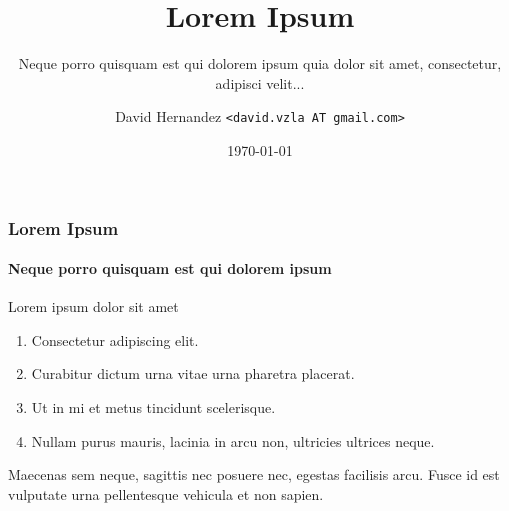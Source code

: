 \documentclass{beamer}
\title{Lorem Ipsum}
\subtitle{Neque porro quisquam est qui dolorem ipsum quia dolor sit amet, consectetur, adipisci velit...}
\date{\today}
\author{David Hernandez \texttt{<david.vzla AT gmail.com>}}
\begin{document}
\begin{frame}
\titlepage
\end{frame}


\begin{frame}
\frametitle{Lorem Ipsum}
\framesubtitle{Neque porro quisquam est qui dolorem ipsum}
\begin{theorem}
Lorem ipsum dolor sit amet \end{theorem}
\begin{enumerate}
\item Consectetur adipiscing elit.
\item Curabitur dictum urna vitae urna pharetra placerat.
\item Ut in mi et metus tincidunt scelerisque.
\item Nullam purus mauris, lacinia in arcu non, ultricies ultrices neque.
\end{enumerate}

Maecenas sem neque, sagittis nec posuere nec, egestas facilisis arcu. Fusce id est vulputate urna pellentesque vehicula et non sapien.

\end{frame}
\end{document}
